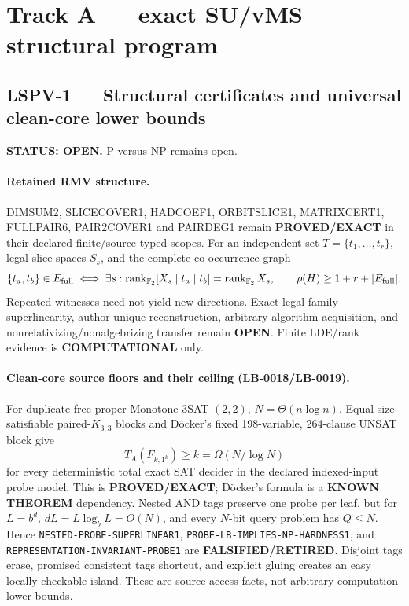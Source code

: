\documentclass[11pt]{article}
\begin{document}
\section{Track A --- exact SU/vMS structural program}

\subsection{LSPV-1 --- Structural certificates and universal clean-core lower bounds}

\textbf{STATUS: OPEN.} P versus NP remains open.

\paragraph{Retained RMV structure.}
DIMSUM2, SLICECOVER1, HADCOEF1, ORBITSLICE1, MATRIXCERT1,
FULLPAIR6, PAIR2COVER1 and PAIRDEG1 remain \textbf{PROVED/EXACT} in their
declared finite/source-typed scopes.  For an independent set
\(T=\{t_1,\ldots,t_r\}\), legal slice spaces \(S_s\), and the complete
co-occurrence graph
\[
 \{t_a,t_b\}\in E_{\rm full}\iff
 \exists s:\operatorname{rank}_{\mathbb F_2}[X_s\mid t_a\mid t_b]
 =\operatorname{rank}_{\mathbb F_2}X_s,
\qquad
 \rho(H)\ge 1+r+|E_{\rm full}|.
\]
Repeated witnesses need not yield new directions.  Exact legal-family
superlinearity, author-unique reconstruction, arbitrary-algorithm acquisition,
and nonrelativizing/nonalgebrizing transfer remain \textbf{OPEN}.  Finite
LDE/rank evidence is \textbf{COMPUTATIONAL} only.

\paragraph{Clean-core source floors and their ceiling (LB-0018/LB-0019).}
For duplicate-free proper Monotone \(3\)SAT-\((2,2)\),
\(N=\Theta(n\log n)\).  Equal-size satisfiable paired-\(K_{3,3}\) blocks and
D\"ocker's fixed 198-variable, 264-clause UNSAT block give
\[
 T_A(F_{k,1^k})\ge k=\Omega(N/\log N)
\]
for every deterministic total exact SAT decider in the declared indexed-input
probe model.  This is \textbf{PROVED/EXACT}; D\"ocker's formula is a
\textbf{KNOWN THEOREM} dependency.  Nested AND tags preserve one probe per
leaf, but for \(L=b^d\), \(dL=L\log_bL=O(N)\), and every \(N\)-bit query
problem has \(Q\le N\).  Hence
\texttt{NESTED-PROBE-SUPERLINEAR1},
\texttt{PROBE-LB-IMPLIES-NP-HARDNESS1}, and
\texttt{REPRESENTATION-INVARIANT-PROBE1} are
\textbf{FALSIFIED/RETIRED}.  Disjoint tags erase, promised consistent tags
shortcut, and explicit gluing creates an easy locally checkable island.
These are source-access facts, not arbitrary-computation lower bounds.
\end{document}

